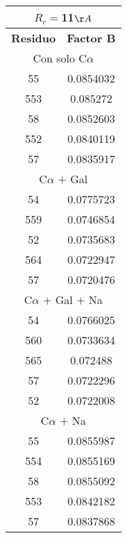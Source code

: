 \begin{tabular}[c]{|c|c|}
\multicolumn{2}{c}{$R_c=$11$\AA$}\\\hline
\textbf{Residuo}&\textbf{Factor B}\\\hline
\multicolumn{2}{c}{Con solo C$\alpha$}\\\hline
        55& 0.0854032\\
       553&  0.085272\\
        58& 0.0852603\\
       552& 0.0840119\\
        57& 0.0835917\\\hline
\multicolumn{2}{c}{C$\alpha$ $+$ Gal}\\\hline
        54& 0.0775723\\
       559& 0.0746854\\
        52& 0.0735683\\
       564& 0.0722947\\
        57& 0.0720476\\\hline
\multicolumn{2}{c}{C$\alpha$ $+$ Gal $+$ Na}\\\hline
        54& 0.0766025\\
       560& 0.0733634\\
       565&  0.072488\\
        57& 0.0722296\\
        52& 0.0722008\\\hline
\multicolumn{2}{c}{C$\alpha$ $+$ Na}\\\hline
        55& 0.0855987\\
       554& 0.0855169\\
        58& 0.0855092\\
       553& 0.0842182\\
        57& 0.0837868\\\hline
\end{tabular}

